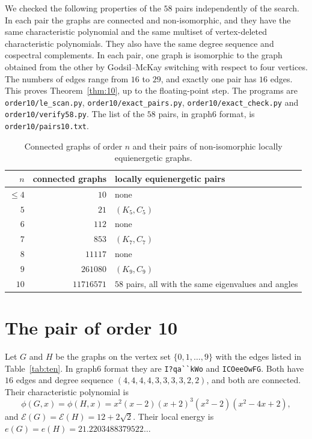 \documentclass[11pt]{amsart}
\theoremstyle{remark}
\newcommand{\cE}{\mathcal{E}}
\begin{document}
We checked the following properties of the $58$ pairs independently of the search.
In each pair the graphs are connected and non-isomorphic, and they have the same characteristic polynomial and the same multiset of vertex-deleted characteristic polynomials.
They also have the same degree sequence and cospectral complements.
In each pair, one graph is isomorphic to the graph obtained from the other by Godsil--McKay switching with respect to four vertices.
The numbers of edges range from $16$ to $29$, and exactly one pair has $16$ edges.
This proves Theorem~\ref{thm:10}, up to the floating-point step.
The programs are \texttt{order10/le\_scan.py}, \texttt{order10/exact\_pairs.py}, \texttt{order10/exact\_check.py} and \texttt{order10/verify58.py}.
The list of the $58$ pairs, in graph6 format, is \texttt{order10/pairs10.txt}.

\begin{table}[ht]
\caption{Connected graphs of order $n$ and their pairs of non-isomorphic locally equienergetic graphs.}\label{tab:search}
\begin{tabular}{rrl}
\toprule
$n$ & connected graphs & locally equienergetic pairs\\
\midrule
$\le4$ & $10$ & none\\
$5$ & $21$ & $(K_5,C_5)$\\
$6$ & $112$ & none\\
$7$ & $853$ & $(K_7,C_7)$\\
$8$ & $11117$ & none\\
$9$ & $261080$ & $(K_9,C_9)$\\
$10$ & $11716571$ & $58$ pairs, all with the same eigenvalues and angles\\
\bottomrule
\end{tabular}
\end{table}

\section{The pair of order 10}\label{sec:ten}

Let $G$ and $H$ be the graphs on the vertex set $\{0,1,\dots,9\}$ with the edges listed in Table~\ref{tab:ten}.
In graph6 format they are \verb|I?qa``kWo| and \verb|ICOeeOwFG|.
Both have $16$ edges and degree sequence $(4,4,4,4,3,3,3,3,2,2)$, and both are connected.
Their characteristic polynomial is
\[
\phi(G,x)=\phi(H,x)=x^2(x-2)(x+2)^3(x^2-2)(x^2-4x+2),
\]
and $\cE(G)=\cE(H)=12+2\sqrt2$.
Their local energy is $e(G)=e(H)=21.2203488379522\ldots$
\end{document}
